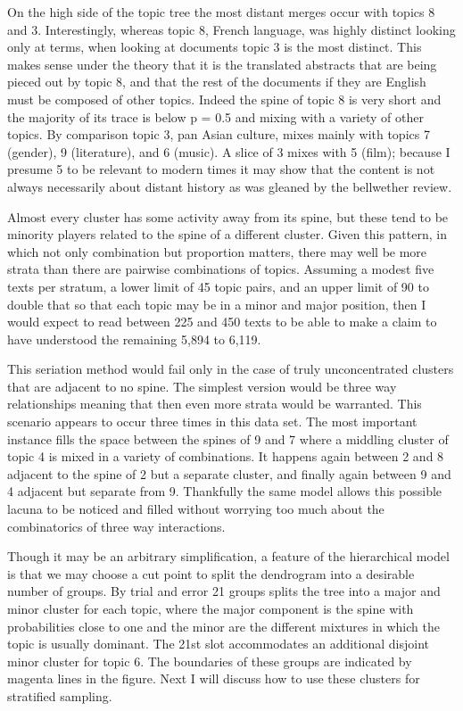 \documentclass[]{book}
\theoremstyle{definition}
\theoremstyle{definition}
\theoremstyle{definition}
\theoremstyle{remark}
\begin{document}
On the high side of the topic tree the most distant merges occur with
topics 8 and 3. Interestingly, whereas topic 8, French language, was
highly distinct looking only at terms, when looking at documents topic 3
is the most distinct. This makes sense under the theory that it is the
translated abstracts that are being pieced out by topic 8, and that the
rest of the documents if they are English must be composed of other
topics. Indeed the spine of topic 8 is very short and the majority of
its trace is below p = 0.5 and mixing with a variety of other topics. By
comparison topic 3, pan Asian culture, mixes mainly with topics 7
(gender), 9 (literature), and 6 (music). A slice of 3 mixes with 5
(film); because I presume 5 to be relevant to modern times it may show
that the content is not always necessarily about distant history as was
gleaned by the bellwether review.

Almost every cluster has some activity away from its spine, but these
tend to be minority players related to the spine of a different cluster.
Given this pattern, in which not only combination but proportion
matters, there may well be more strata than there are pairwise
combinations of topics. Assuming a modest five texts per stratum, a
lower limit of 45 topic pairs, and an upper limit of 90 to double that
so that each topic may be in a minor and major position, then I would
expect to read between 225 and 450 texts to be able to make a claim to
have understood the remaining 5,894 to 6,119.

This seriation method would fail only in the case of truly
unconcentrated clusters that are adjacent to no spine. The simplest
version would be three way relationships meaning that then even more
strata would be warranted. This scenario appears to occur three times in
this data set. The most important instance fills the space between the
spines of 9 and 7 where a middling cluster of topic 4 is mixed in a
variety of combinations. It happens again between 2 and 8 adjacent to
the spine of 2 but a separate cluster, and finally again between 9 and 4
adjacent but separate from 9. Thankfully the same model allows this
possible lacuna to be noticed and filled without worrying too much about
the combinatorics of three way interactions.

Though it may be an arbitrary simplification, a feature of the
hierarchical model is that we may choose a cut point to split the
dendrogram into a desirable number of groups. By trial and error 21
groups splits the tree into a major and minor cluster for each topic,
where the major component is the spine with probabilities close to one
and the minor are the different mixtures in which the topic is usually
dominant. The 21st slot accommodates an additional disjoint minor
cluster for topic 6. The boundaries of these groups are indicated by
magenta lines in the figure. Next I will discuss how to use these
clusters for stratified sampling.
\end{document}
